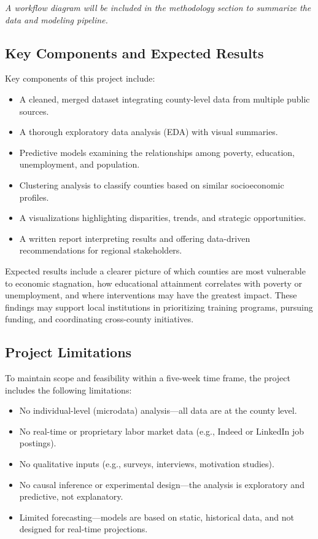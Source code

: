\documentclass[12pt]{llncs}
\begin{document}
\textit{A workflow diagram will be included in the methodology section to summarize the data and modeling pipeline.}

\subsection{Key Components and Expected Results}
Key components of this project include:
\begin{itemize}
    \item A cleaned, merged dataset integrating county-level data from multiple public sources.
    \item A thorough exploratory data analysis (EDA) with visual summaries.
    \item Predictive models examining the relationships among poverty, education, unemployment, and population.
    \item Clustering analysis to classify counties based on similar socioeconomic profiles.
    \item A visualizations highlighting disparities, trends, and strategic opportunities.
    \item A written report interpreting results and offering data-driven recommendations for regional stakeholders.
\end{itemize}

Expected results include a clearer picture of which counties are most vulnerable to economic stagnation, how educational attainment correlates with poverty or unemployment, and where interventions may have the greatest impact. These findings may support local institutions in prioritizing training programs, pursuing funding, and coordinating cross-county initiatives.

\subsection{Project Limitations}
To maintain scope and feasibility within a five-week time frame, the project includes the following limitations:
\begin{itemize}
    \item No individual-level (microdata) analysis—all data are at the county level.
    \item No real-time or proprietary labor market data (e.g., Indeed or LinkedIn job postings).
    \item No qualitative inputs (e.g., surveys, interviews, motivation studies).
    \item No causal inference or experimental design—the analysis is exploratory and predictive, not explanatory.
    \item Limited forecasting—models are based on static, historical data, and not designed for real-time projections.
\end{itemize}
\end{document}
